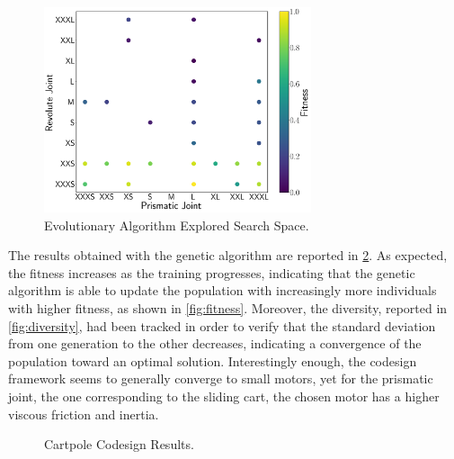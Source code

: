 \begin{figure}
    \centering
    \caption{Evolutionary Algorithm Explored Search Space.}
    \label{fig:searchspace}
    \includegraphics[width=0.7\textwidth]{Images/search_space.png}
\end{figure}

The results obtained with the genetic algorithm are reported in \cref{fig:codesignresults}. As expected, the fitness increases as the training progresses, indicating that the genetic algorithm is able to update the population with increasingly more individuals with higher fitness, as shown in \cref{fig:fitness}. Moreover, the diversity, reported in \cref{fig:diversity}, had been tracked in order to verify that the standard deviation from one generation to the other decreases, indicating a convergence of the population toward an optimal solution. Interestingly enough, the codesign framework seems to generally converge to small motors, yet for the prismatic joint, the one corresponding to the sliding cart, the chosen motor has a higher viscous friction and inertia.

\begin{figure}
    \centering
    \caption{Cartpole Codesign Results.}
    \label{fig:codesignresults}
\end{figure}
